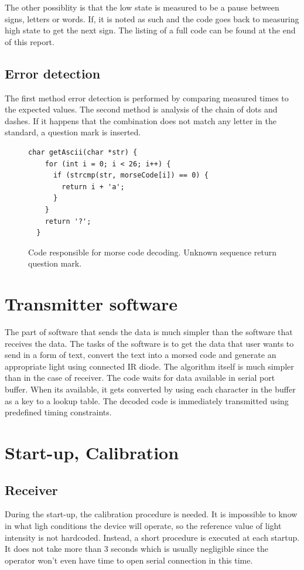 \documentclass[12pt]{article}
\begin{document}
  The other possiblity is that the low state is measured to be a pause between signs, letters or words. If, it is noted as such and the code goes back to measuring high state to get the next sign.
  The listing of a full code can be found at the end of this report.

  \subsection{Error detection}
  The first method error detection is performed by comparing measured times to the expected values.
  The second method is analysis of the chain of dots and dashes. If it happens that the combination does not match any letter in the standard, a question mark is inserted.
  \begin{figure}[h]
  \begin{lstlisting}[autogobble,style=CStyle]
  char getAscii(char *str) {
    for (int i = 0; i < 26; i++) {
      if (strcmp(str, morseCode[i]) == 0) {
        return i + 'a';
      }
    }
    return '?';
  }
  \end{lstlisting}
    \caption{Code responsible for morse code decoding. Unknown sequence return question mark.}
  \end{figure}
	
	\section{Transmitter software}
  The part of software that sends the data is much simpler than the software that receives the data.
  The tasks of the software is to get the data that user wants to send in a form of text, convert the text into a morsed code 
  and generate an appropriate light using connected IR diode. 
  The algorithm itself is much simpler than in the case of receiver. The code waits for data available in serial port buffer.
  When its available, it gets converted by using each character in the buffer as a key to a lookup table.
  The decoded code is immediately transmitted using predefined timing constraints.

	\section{Start-up, Calibration}
  \subsection{Receiver}
  During the start-up, the calibration procedure is needed. It is impossible to know in what ligh conditions the device will operate, so the reference value of light intensity is not hardcoded.
  Instead, a short procedure is executed at each startup. It does not take more than 3 seconds which is usually negligible since the operator won't even have time to open serial connection in this time.
\end{document}
